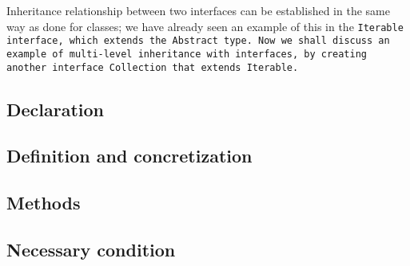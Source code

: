 \def\Subsection#1{\subsection{#1}}

Inheritance relationship between two interfaces can be established in
the same way as done for classes; we have already seen an example of this
in the \tt{Iterable} interface, which extends the \tt{Abstract} type.
Now we shall discuss an example of multi-level inheritance with interfaces,
by creating another interface \tt{Collection} that extends \tt{Iterable}.

\Subsection{Declaration}

\Subsection{Definition and concretization}

\Subsection{Methods}

\Subsection{Necessary condition}
